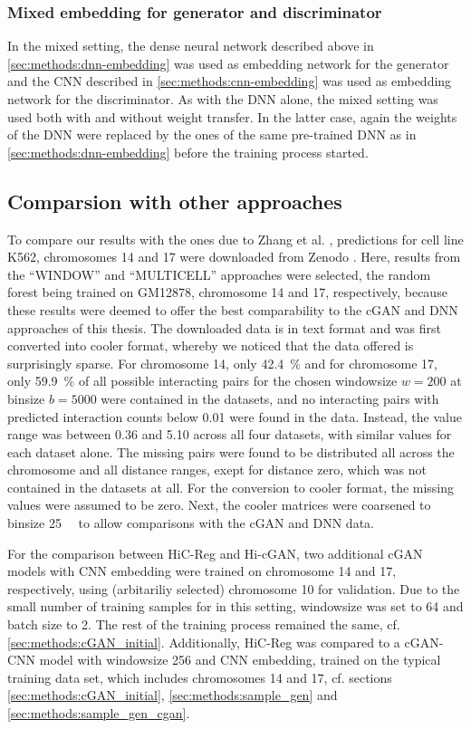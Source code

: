 \subsubsection{Mixed embedding for generator and discriminator} \label{sec:methods:mixed-embedding}
In the mixed setting, the dense neural network described above in \cref{sec:methods:dnn-embedding} was used as  
embedding network for the generator and the CNN described in \cref{sec:methods:cnn-embedding} was used as embedding
network for the discriminator.
As with the DNN alone, the mixed setting was used both with and without weight transfer.
In the latter case, again the weights of the DNN were replaced by the ones of the same pre-trained DNN as in \cref{sec:methods:dnn-embedding}
 before the training process started.

\subsection{Comparsion with other approaches} \label{sec:methods:comparison}
To compare our results with the ones due to Zhang et al. \cite{Zhang2019},
predictions for cell line K562, chromosomes 14 and 17 were downloaded from Zenodo \xxx.
Here, results from the ``WINDOW'' and ``MULTICELL'' approaches were selected, the random forest being trained on GM12878, chromosome 14 and 17, respectively,
because these results were deemed to offer the best comparability to the cGAN and DNN approaches of this thesis.
The downloaded data is in text format and was first converted into cooler format, whereby we noticed that the data offered is surprisingly sparse.
For chromosome 14, only \SI{42.4}{\percent} and for chromosome 17, only \SI{59.9}{\percent} of all possible interacting pairs 
for the chosen windowsize $w=200$ at binsize $b=5000$ were contained in the datasets, 
and no interacting pairs with predicted interaction counts below 0.01 were found in the data. 
Instead, the value range was between 0.36 and 5.10 across all four datasets, with similar values for each dataset alone.
The missing pairs were found to be distributed all across the chromosome and all distance ranges, exept for distance zero, which was not contained in the datasets at all.
For the conversion to cooler format, the missing values were assumed to be zero.
Next, the cooler matrices were coarsened to binsize \SI{25}{\kilo\bp} to allow comparisons with the cGAN and DNN data.

For the comparison between HiC-Reg and Hi-cGAN, two additional cGAN models with CNN embedding were trained on chromosome 14 and 17, respectively,
using (arbitariliy selected) chromosome 10 for validation. Due to the small number of training samples for in this setting, windowsize was set to 64 and batch size to 2.
The rest of the training process remained the same, cf. \cref{sec:methods:cGAN_initial}.
Additionally, HiC-Reg was compared to a cGAN-CNN model with windowsize 256 and CNN embedding, trained on the typical training data set, 
which includes chromosomes 14 and 17, cf. sections \ref{sec:methods:cGAN_initial}, \ref{sec:methods:sample_gen} and \ref{sec:methods:sample_gen_cgan}.

